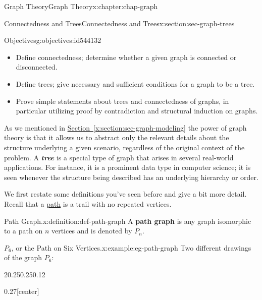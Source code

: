 \documentclass[oneside,10pt,]{book}
\newcommand{\xreffont}{\relax}
\newcommand{\alert}[1]{\textbf{\textit{#1}}}
\newcommand{\terminology}[1]{\textbf{#1}}
\numberwithin{equation}{section}
\begin{document}
\begin{chapterptx}{Graph Theory}{}{Graph Theory}{}{}{x:chapter:chap-graph}
%
%
\typeout{************************************************}
\typeout{************************************************}
%
\begin{sectionptx}{Connectedness and Trees}{}{Connectedness and Trees}{}{}{x:section:sec-graph-trees}
\begin{objectives}{Objectives}{g:objectives:id544132}
%
\begin{itemize}[label=\textbullet]
\item{}Define connectedness; determine whether a given graph is connected or disconnected.%
\item{}Define trees; give necessary and sufficient conditions for a graph to be a tree.%
\item{}Prove simple statements about trees and connectedness of graphs, in particular utilizing proof by contradiction and structural induction on graphs.%
\end{itemize}
\end{objectives}
As we mentioned in \hyperref[x:section:sec-graph-modeling]{Section~{\xreffont\ref{x:section:sec-graph-modeling}}} the power of graph theory is that it allows us to abstract only the relevant details about the structure underlying a given scenario, regardless of the original context of the problem. A \alert{tree} is a special type of graph that arises in several real-world applications. For instance, it is a prominent data type in computer science; it is seen whenever the structure being described has an underlying hierarchy or order.%
\par
We first restate some definitions you've seen before and give a bit more detail. Recall that a \hyperref[x:definition:def-path]{path} is a trail with no repeated vertices.%
\begin{definition}{Path Graph.}{x:definition:def-path-graph}%
A \terminology{path graph} is any graph isomorphic to a path on \(n\) vertices and is denoted by \(P_n\). \label{g:notation:id544195}%
\end{definition}
\begin{example}{\(P_6\), or the Path on Six Vertices.}{x:example:eg-path-graph}%
Two different drawings of the graph \(P_6\):%
\begin{sidebyside}{2}{0.25}{0.25}{0.12}%
\begin{sbspanel}{0.27}[center]%
\end{sbspanel}
\end{sidebyside}
\end{example}
\end{sectionptx}
\end{chapterptx}
\end{document}
